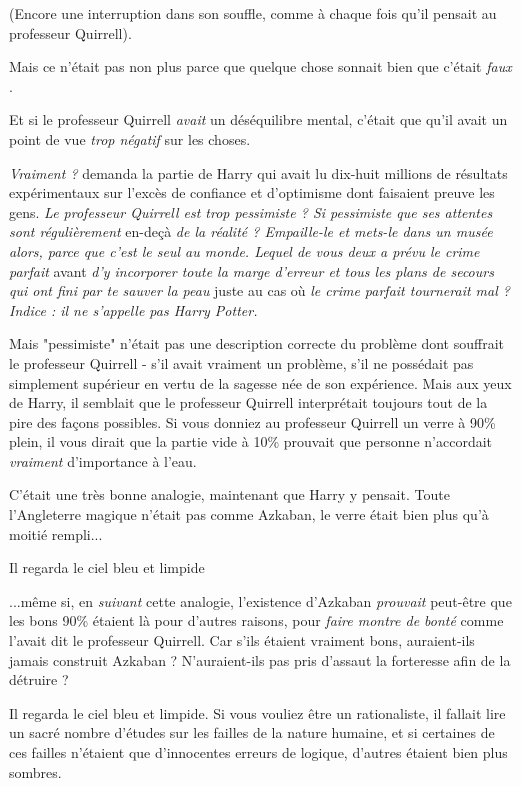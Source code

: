 (Encore une interruption dans son souffle, comme à chaque fois qu'il pensait au professeur Quirrell).

Mais ce n'était pas non plus parce que quelque chose sonnait bien que c'était \emph{faux} .

Et si le professeur Quirrell \emph{avait}  un déséquilibre mental, c'était que qu'il avait un point de vue \emph{trop négatif}  sur les choses.

\emph{Vraiment ?}  demanda la partie de Harry qui avait lu dix-huit millions de résultats expérimentaux sur l'excès de confiance et d'optimisme dont faisaient preuve les gens. \emph{Le professeur Quirrell est trop pessimiste ? Si pessimiste que ses attentes sont régulièrement } en-deçà \emph{de la réalité ? Empaille-le et mets-le dans un musée alors, parce que c'est le seul au monde. Lequel de vous deux a prévu le crime parfait } avant\emph{ d'y incorporer toute la marge d'erreur et tous les plans de secours qui ont fini par te sauver la peau } juste au cas où \emph{le crime parfait tournerait mal ? Indice : il ne s'appelle pas Harry Potter.} 

Mais "pessimiste" n'était pas une description correcte du problème dont souffrait le professeur Quirrell - s'il avait vraiment un problème, s'il ne possédait pas simplement supérieur en vertu de la sagesse née de son expérience. Mais aux yeux de Harry, il semblait que le professeur Quirrell interprétait toujours tout de la pire des façons possibles. Si vous donniez au professeur Quirrell un verre à 90\% plein, il vous dirait que la partie vide à 10\% prouvait que personne n'accordait \emph{vraiment}  d'importance à l'eau.

C'était une très bonne analogie, maintenant que Harry y pensait. Toute l'Angleterre magique n'était pas comme Azkaban, le verre était bien plus qu'à moitié rempli...

Il regarda le ciel bleu et limpide

...même si, en \emph{suivant } cette analogie, l'existence d'Azkaban \emph{prouvait}  peut-être que les bons 90\% étaient là pour d'autres raisons, pour \emph{faire montre de bonté}  comme l'avait dit le professeur Quirrell. Car s'ils étaient vraiment bons, auraient-ils jamais construit Azkaban ? N'auraient-ils pas pris d'assaut la forteresse afin de la détruire ?

Il regarda le ciel bleu et limpide. Si vous vouliez être un rationaliste, il fallait lire un sacré nombre d'études sur les failles de la nature humaine, et si certaines de ces failles n'étaient que d'innocentes erreurs de logique, d'autres étaient bien plus sombres.

